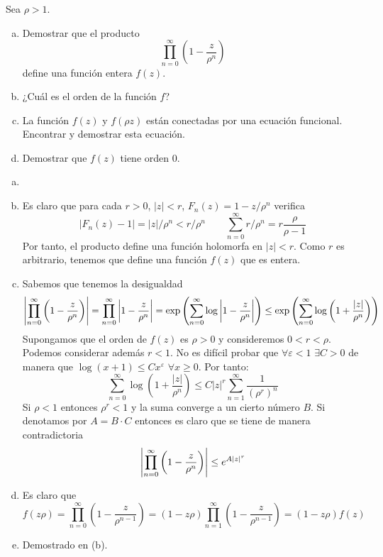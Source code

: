 \documentclass[twoside]{article}
\begin{document}
\newpage

\begin{ejercicio}{3}
Sea $\rho>1$.
\begin{enumerate}[(a)]
\item Demostrar que el producto
$$
\prod_{n=0}^\infty \left(1-\frac{z}{\rho^n}\right) 
$$
define una función entera $f(z)$.
\item ¿Cuál es el orden de la función $f$?
\item La función $f(z)$ y $f(\rho z)$ están conectadas por una ecuación funcional. Encontrar y demostrar esta ecuación.
\item Demostrar que $f(z)$ tiene orden $0$.
\end{enumerate}
\end{ejercicio}
\begin{solucion}
\begin{enumerate}[(a)]
\item[]
\item Es claro que para cada $r>0$, $|z|< r$, $F_n(z)=1-z/\rho^n$ verifica 
$$
|F_n(z)-1| = |z|/\rho^n < r/\rho^n \qquad \sum_{n=0}^\infty r/\rho^n = r \frac{\rho}{\rho-1}
$$
Por tanto, el producto define una función holomorfa en $|z|<r$. Como $r$ es arbitrario, tenemos que define una función $f(z)$ que es entera.
\item Sabemos que tenemos la desigualdad
$$
\left\lvert\prod_{n=0}^\infty \left(1-\frac{z}{\rho^n}\right)\right\rvert  = \prod_{n=0}^\infty \left\lvert1-\frac{z}{\rho^n}\right\rvert = \exp\left(\sum_{n=0}^\infty \log \left\lvert1-\frac{z}{\rho^n}\right\rvert\right) \leq  \exp\left(\sum_{n=0}^\infty \log \left({1+\frac{|z|}{\rho^n}}\right)\right)
$$
Supongamos que el orden de $f(z)$ es $\rho>0$ y consideremos $0<r<\rho$. Podemos considerar además $r<1$. No es difícil probar que $\forall \varepsilon < 1$ $\exists C >0$ de manera que $\log(x+1)\leq C x^\varepsilon$ $\forall x \geq 0$. Por tanto:
$$
\sum_{n=0}^\infty \log \left({1+\frac{|z|}{\rho^n}}\right) \leq C |z|^{r}\sum_{n=1}^\infty \frac{1}{(\rho^{r})^n}
$$
Si $\rho<1$ entonces $\rho^{r}<1$ y la suma converge a un cierto número $B$. Si denotamos por $A = B\cdot C$ entonces es claro que se tiene de manera contradictoria
$$
\left\lvert\prod_{n=0}^\infty \left(1-\frac{z}{\rho^n}\right)\right\rvert \leq e^{A|z|^{r}}
$$
\item Es claro que 
$$
f(z\rho) = \prod_{n=0}^\infty  \left(1-\frac{z}{\rho^{n-1}}\right)  = (1-z\rho)\prod_{n=1}^\infty  \left(1-\frac{z}{\rho^{n-1}}\right)  = (1-z\rho)f(z)
$$
\item Demostrado en (b).
\end{enumerate}
\end{solucion}
\end{document}
